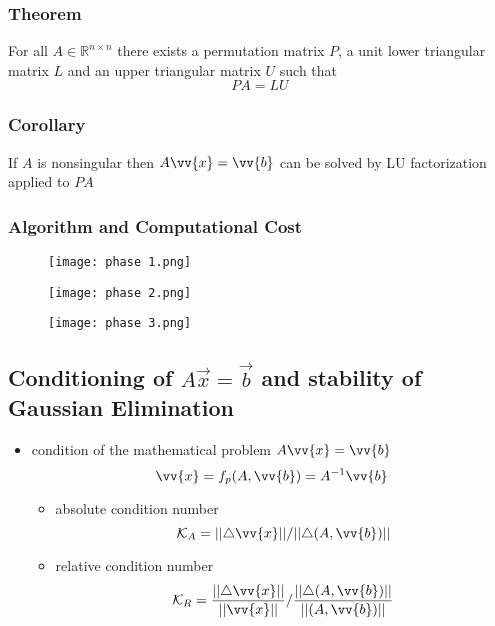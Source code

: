 \documentclass[11pt]{article}
\newcommand{\R}{{\mathbb{R}}}
\newcommand{\vb}{\vv{b}}
\newcommand{\vx}{\vv{x}}
\newcommand{\tri}{\triangle}
\begin{document}
\subsubsection*{Theorem}
For all $A\in\R^{n\times n}$ there exists a permutation matrix $P$, a unit lower triangular matrix $L$ and an upper triangular matrix $U$ such that \[PA=LU\]
\subsubsection*{Corollary}
If $A$ is nonsingular then $A\vx=\vb$ can be solved by LU factorization applied to $PA$
\subsubsection*{Algorithm and Computational Cost}
\begin{figure}[tbhp]
	\begin{center}
		\texttt{[image: phase 1.png]}
	\end{center}
	\label{figcaption}
\end{figure}
\begin{figure}[tbhp]
	\begin{center}
		\texttt{[image: phase 2.png]}
	\end{center}
	\label{figcaption}
\end{figure}
\begin{figure}[tbhp]
	\begin{center}
		\texttt{[image: phase 3.png]}
	\end{center}
	\label{figcaption}
\end{figure}
\newpage 
\subsection{Conditioning of $A\vec{x}=\vec{b}$ and stability of Gaussian Elimination}
\begin{itemize}
  \item condition of the mathematical problem $A\vx=\vb$ \[\vx = f_p(A,\vb) = A^{-1}\vb\]
  \begin{itemize}
    \item absolute condition number \[\mathcal{K}_A = ||\tri\vx||/||\tri(A,\vb)||\]
    \item relative condition number \[\mathcal{K}_R = \frac{||\tri\vx||}{||\vx||} / \frac{||\tri(A,\vb)||}{||(A,\vb)||}\]
  \end{itemize}
\end{itemize}
\end{document}
